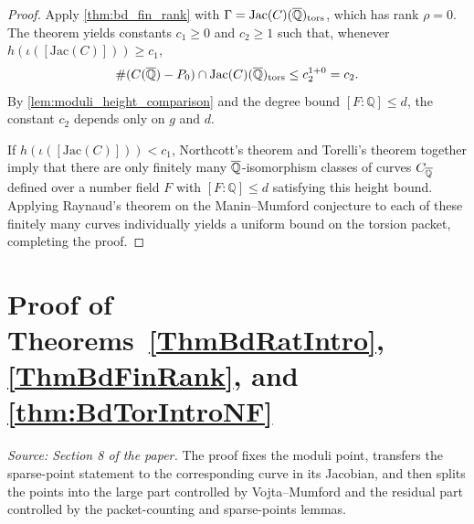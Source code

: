 %
\begin{proof}
  Apply \cref{thm:bd_fin_rank} with \(\Gamma = \mathrm{Jac}(C)(\overline{\mathbb{Q}})_{\mathrm{tors}}\),
  which has rank \(\rho = 0\). The theorem yields constants \(c_1 \ge 0\) and
  \(c_2 \ge 1\) such that, whenever \(h(\iota([\mathrm{Jac}(C)])) \ge c_1\),
  \[
    \#(C(\overline{\mathbb{Q}}) - P_0) \cap \mathrm{Jac}(C)(\overline{\mathbb{Q}})_{\mathrm{tors}} \le c_2^{1+0} = c_2.
  \]
  By \cref{lem:moduli_height_comparison} and the degree bound \([F:\mathbb{Q}] \le d\),
  the constant \(c_2\) depends only on \(g\) and \(d\).

  If \(h(\iota([\mathrm{Jac}(C)])) < c_1\), Northcott's theorem and Torelli's
  theorem together imply that there are only finitely many
  \(\overline{\mathbb{Q}}\)-isomorphism classes of curves \(C_{\overline{\mathbb{Q}}}\) defined over a number
  field \(F\) with \([F:\mathbb{Q}] \le d\) satisfying this height bound. Applying
  Raynaud's theorem on the Manin--Mumford conjecture to each of these finitely
  many curves individually yields a uniform bound on the torsion packet,
  completing the proof.
\end{proof}

\section{Proof of Theorems~\ref{ThmBdRatIntro}, \ref{ThmBdFinRank}, and \ref{thm:BdTorIntroNF}}

\begin{proposition}
  \label{prop:premazur}
  \textit{Source: Section 8 of the paper.}
  The proof fixes the moduli point, transfers the sparse-point statement to the
  corresponding curve in its Jacobian, and then splits the points into the large
  part controlled by Vojta--Mumford and the residual part controlled by the
  packet-counting and sparse-points lemmas.
\end{proposition}

